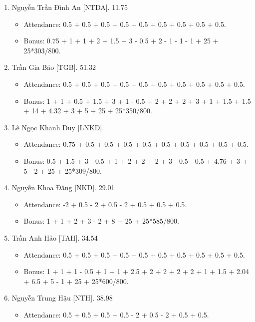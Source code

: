 \documentclass{article}
\begin{document}
\begin{enumerate}
    \item {\sc Nguyễn Trần Đình An [NTDA].} 11.75
    \begin{itemize}
        \item Attendance: 0.5 + 0.5 + 0.5 + 0.5 + 0.5 + 0.5 + 0.5 + 0.5 + 0.5.
        \item Bonus: 0.75 + 1 + 1 + 2 + 1.5 + 3 - 0.5 + 2 - 1 - 1 - 1 + 25 + 25*303/800.
    \end{itemize}
    \item {\sc Trần Gia Bảo [TGB].} 51.32
    \begin{itemize}
        \item Attendance: 0.5 + 0.5 + 0.5 + 0.5 + 0.5 + 0.5 + 0.5 + 0.5 + 0.5 + 0.5.
        \item Bonus: 1 + 1 + 0.5 + 1.5 + 3 + 1 - 0.5 + 2 + 2 + 2 + 3 + 1 + 1.5 + 1.5 + 14 + 4.32 + 3 + 5 + 25 + 25*350/800.
    \end{itemize}
    \item {\sc Lê Ngọc Khanh Duy [LNKD].}
    \begin{itemize}
        \item Attendance: 0.75 + 0.5 + 0.5 + 0.5 + 0.5 + 0.5 + 0.5 + 0.5 + 0.5 + 0.5.
        \item Bonus: 0.5 + 1.5 + 3 - 0.5 + 1 + 2 + 2 + 2 + 3 - 0.5 - 0.5 + 4.76 + 3 + 5 - 2 + 25 + 25*309/800.
    \end{itemize}
    \item {\sc Nguyễn Khoa Đăng [NKD].} 29.01
    \begin{itemize}
        \item Attendance: -2 + 0.5 - 2 + 0.5 - 2 + 0.5 + 0.5 + 0.5.
        \item Bonus: 1 + 1 + 2 + 3 - 2 + 8 + 25 + 25*585/800.
    \end{itemize}
    \item {\sc Trần Anh Hảo [TAH].} 34.54
    \begin{itemize}
        \item Attendance: 0.5 + 0.5 + 0.5 + 0.5 + 0.5 + 0.5 + 0.5 + 0.5 + 0.5 + 0.5.
        \item Bonus: 1 + 1 + 1 - 0.5 + 1 + 1 + 2.5 + 2 + 2 + 2 + 2 + 1 + 1.5 + 2.04 + 6.5 + 5 - 1 + 25 + 25*600/800.
    \end{itemize}
    \item {\sc Nguyễn Trung Hậu [NTH].} 38.98
    \begin{itemize}
        \item Attendance: 0.5 + 0.5 + 0.5 + 0.5 - 2 + 0.5 - 2 + 0.5 + 0.5.

\end{itemize}
\end{enumerate}
\end{document}
